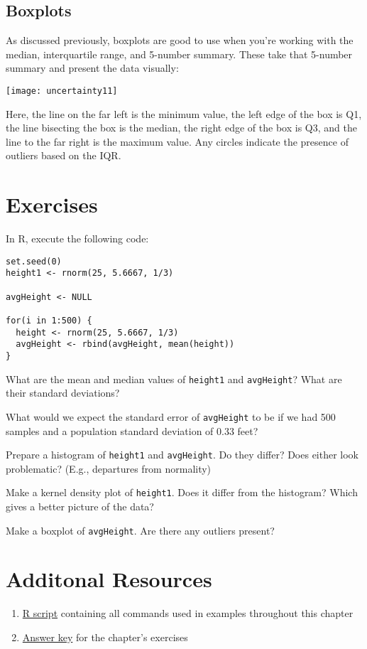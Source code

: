 \subsection{Boxplots}

As discussed previously, boxplots are good to use when you're working with the median, interquartile range, and 5-number summary. These take that 5-number summary and present the data visually:

\texttt{[image: uncertainty11]}

Here, the line on the far left is the minimum value, the left edge of the box is Q1, the line bisecting the box is the median, the right edge of the box is Q3, and the line to the far right is the maximum value. Any circles indicate the presence of outliers based on the IQR.

\section{Exercises}

\prob In R, execute the following code:
\begin{Verbatim}[samepage=TRUE]
set.seed(0)
height1 <- rnorm(25, 5.6667, 1/3)
 
avgHeight <- NULL
 
for(i in 1:500) {
  height <- rnorm(25, 5.6667, 1/3)
  avgHeight <- rbind(avgHeight, mean(height))
}
\end{Verbatim}

\prob What are the mean and median values of \verb|height1| and \verb|avgHeight|? What are their standard deviations?

\prob What would we expect the standard error of \verb|avgHeight| to be if we had 500 samples and a population standard deviation of 0.33 feet?

\prob Prepare a histogram of \verb|height1| and \verb|avgHeight|. Do they differ? Does either look problematic? (E.g., departures from normality)

\prob Make a kernel density plot of \verb|height1|. Does it differ from the histogram? Which gives a better picture of the data?

\prob Make a boxplot of \verb|avgHeight|. Are there any outliers present?

\section{Additonal Resources}
\begin{enumerate}
	\item \href{http://book.chriswetherill.me/part1/RScripts/uncertainty.R}{R script} containing all commands used in examples throughout this chapter
	\item \href{http://book.chriswetherill.me/part1/answers/uncertainty.html}{Answer key} for the chapter's exercises
\end{enumerate}